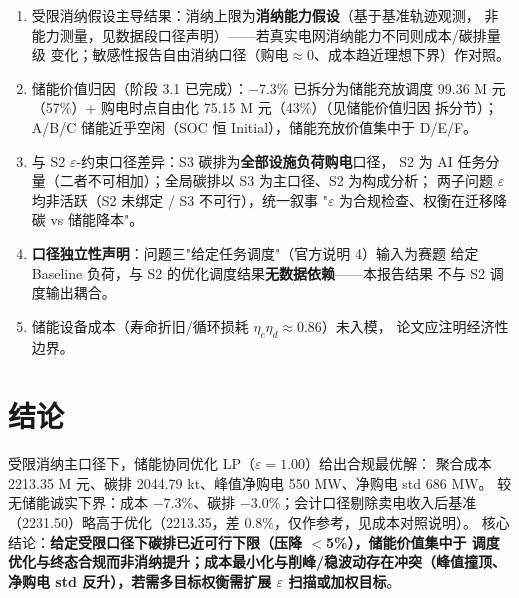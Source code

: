 \documentclass{internal-report}
\begin{document}
\begin{enumerate}
  \item 受限消纳假设主导结果：消纳上限为\textbf{消纳能力假设}（基于基准轨迹观测，
        非能力测量，见数据段口径声明）——若真实电网消纳能力不同则成本/碳排量级
        变化；敏感性报告自由消纳口径（购电$\approx0$、成本趋近理想下界）作对照。
  \item 储能价值归因（阶段 3.1 已完成）：$-$7.3\% 已拆分为储能充放调度
        99.36 M 元（57\%）+ 购电时点自由化 75.15 M 元（43\%）（见储能价值归因
        拆分节）；A/B/C 储能近乎空闲（SOC 恒 Initial），储能充放价值集中于
        D/E/F。
  \item 与 S2 $\varepsilon$-约束口径差异：S3 碳排为\textbf{全部设施负荷购电}口径，
        S2 为 AI 任务分量（二者不可相加）；全局碳排以 S3 为主口径、S2 为构成分析；
        两子问题 $\varepsilon$ 均非活跃（S2 未绑定 / S3 不可行），统一叙事
        "$\varepsilon$ 为合规检查、权衡在迁移降碳 vs 储能降本"。
  \item \textbf{口径独立性声明}：问题三"给定任务调度"（官方说明 4）输入为赛题
        给定 Baseline 负荷，与 S2 的优化调度结果\textbf{无数据依赖}——本报告结果
        不与 S2 调度输出耦合。
  \item 储能设备成本（寿命折旧/循环损耗 $\eta_c\eta_d\approx0.86$）未入模，
        论文应注明经济性边界。
\end{enumerate}

\section{结论}

受限消纳主口径下，储能协同优化 LP（$\varepsilon{=}1.00$）给出合规最优解：
聚合成本 2213.35 M 元、碳排 2044.79 kt、峰值净购电 550 MW、净购电 std 686 MW。
较无储能诚实下界：成本 $-7.3\%$、碳排 $-3.0\%$；会计口径剔除卖电收入后基准
（2231.50）略高于优化（2213.35，差 $0.8\%$，仅作参考，见成本对照说明）。
核心结论：\textbf{给定受限口径下碳排已近可行下限（压降 $<$5\%），储能价值集中于
调度优化与终态合规而非消纳提升；成本最小化与削峰/稳波动存在冲突（峰值撞顶、
净购电 std 反升），若需多目标权衡需扩展 $\varepsilon$ 扫描或加权目标}。
\end{document}
